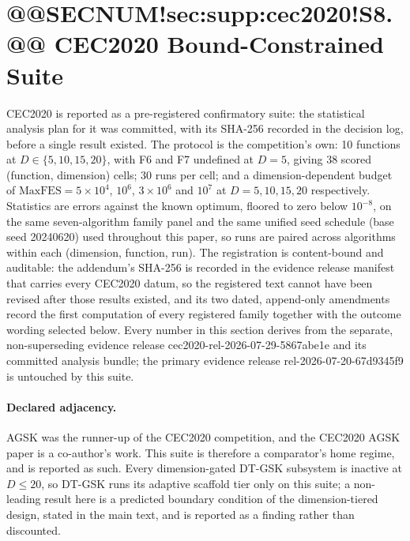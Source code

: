 \documentclass[10pt,a4paper]{article}
\newcommand{\dtgsk}{DT-GSK}
\begin{document}
\section{@@SECNUM!sec:supp:cec2020!S8.@@ CEC2020 Bound-Constrained Suite}\label{sec:supp:cec2020}

\noindent CEC2020 is reported as a pre-registered confirmatory suite: the
statistical analysis plan for it was committed, with its SHA-256 recorded in
the decision log, before a single result existed.  The protocol is the
competition's own: 10 functions at
$D \in \{5, 10, 15, 20\}$, with F6 and F7 undefined at $D = 5$, giving 38
scored (function, dimension) cells; 30 runs per cell; and a
dimension-dependent budget of $\mathrm{MaxFES} = 5 \times 10^{4}$,
$10^{6}$, $3 \times 10^{6}$ and $10^{7}$ at $D = 5, 10, 15, 20$
respectively.  Statistics are errors against the known optimum, floored to
zero below $10^{-8}$, on the same seven-algorithm family panel and the same
unified seed schedule (base seed 20240620) used throughout this paper, so
runs are paired across algorithms within each (dimension, function, run).
The registration is content-bound and auditable: the addendum's SHA-256 is
recorded in the evidence release manifest that carries every CEC2020 datum,
so the registered text cannot have been revised after those results existed,
and its two dated,
append-only amendments record the first computation of every registered
family together with the outcome wording selected below.  Every number in
this section derives from the separate, non-superseding evidence release
cec2020-rel-2026-07-29-5867abe1e and its committed analysis bundle; the
primary evidence release rel-2026-07-20-67d9345f9 is untouched by this
suite.




\paragraph{Declared adjacency.}
AGSK was the runner-up of the CEC2020 competition, and
the CEC2020 AGSK paper is a co-author's work.  This suite is therefore a comparator's home regime, and
is reported as such.  Every dimension-gated \dtgsk{} subsystem is inactive
at $D \le 20$, so \dtgsk{} runs its adaptive scaffold tier only on this
suite; a non-leading result here is a predicted boundary condition of the
dimension-tiered design, stated in the main text, and is reported as a
finding rather than discounted.
\end{document}
